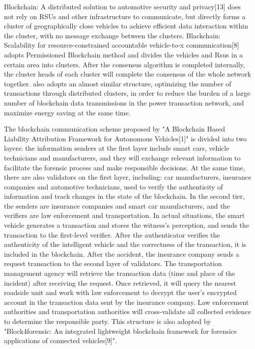 Blockchain: A distributed solution to automotive security and privacy[13] does not rely on RSUs and other infrastructure to communicate, but directly forms a cluster of geographically close vehicles to achieve efficient data interaction within the cluster, with no message exchange between the clusters. Blackchain: Scalability for resource-constrained accountable vehicle-to-x communication[8] adopts Permissioned Blockchain method and divides the vehicles and Rsus in a certain area into clusters. After the consensus algorithm is completed internally, the cluster heads of each cluster will complete the consensus of the whole network together.\cite{ref65} also adopts an almost similar structure, optimizing the number of transactions through distributed clusters, in order to reduce the burden of a large number of blockchain data transmissions in the power transaction network, and maximize energy saving at the same time. 

The blockchain communication scheme proposed by "A Blockchain Based Liability Attribution Framework for Autonomous Vehicles[1]" is divided into two layers: the information senders at the first layer include smart cars, vehicle technicians and manufacturers, and they will exchange relevant information to facilitate the forensic process and make responsible decisions. At the same time, there are also validators on the first layer, including: car manufacturers, insurance companies and automotive technicians, used to verify the authenticity of information and track changes in the state of the blockchain. In the second tier, the senders are insurance companies and smart car manufacturers, and the verifiers are law enforcement and transportation. In actual situations, the smart vehicle generates a transaction and stores the witness's perception, and sends the transaction to the first-level verifier. After the authenticator verifies the authenticity of the intelligent vehicle and the correctness of the transaction, it is included in the blockchain. After the accident, the insurance company sends a request transaction to the second layer of validators. The transportation management agency will retrieve the transaction data (time and place of the incident) after receiving the request. Once retrieved, it will query the nearest roadside unit and work with law enforcement to decrypt the user’s encrypted account in the transaction data sent by the insurance company. Law enforcement authorities and transportation authorities will cross-validate all collected evidence to determine the responsible party. This structure is also adopted by "Block4forensic: An integrated lightweight blockchain framework for forensics applications of connected vehicles[9]".


